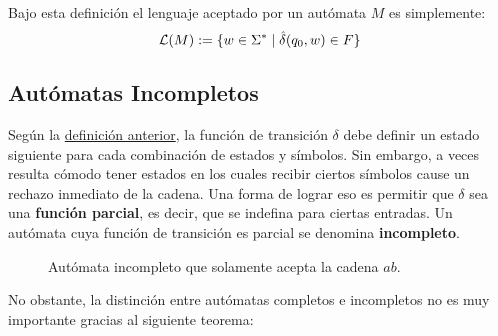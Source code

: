 Bajo esta definición el lenguaje aceptado por un autómata $M$ es simplemente:
$$
\mathcal{L} (M) := \{w \in \Sigma^* \mid \hat \delta (q_0, w) \in F \}
$$

\subsection{Autómatas Incompletos}

Según la \hyperref[subsec-definicion-afds]{definición anterior}, la función de transición $\delta$ debe definir un estado siguiente para cada combinación de estados y símbolos. Sin embargo, a veces resulta cómodo tener estados en los cuales recibir ciertos símbolos cause un rechazo inmediato de la cadena. Una forma de lograr eso es permitir que $\delta$ sea una \textbf{función parcial}, es decir, que se indefina para ciertas entradas. Un autómata cuya función de transición es parcial se denomina \textbf{incompleto}.

\begin{figure}[H]
    \centering
    \caption*{Autómata incompleto que solamente acepta la cadena $ab$.}
\end{figure}

No obstante, la distinción entre autómatas completos e incompletos no es muy importante gracias al siguiente teorema:

